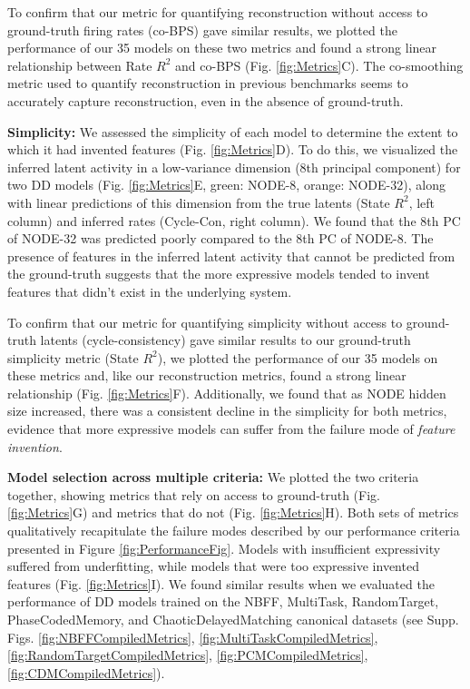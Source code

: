 \documentclass{article}
\begin{document}
To confirm that our metric for quantifying reconstruction without access to ground-truth firing rates (co-BPS) gave similar results, we plotted the performance of our 35 models on these two metrics and found a strong linear relationship between Rate $R^2$ and co-BPS (Fig. \ref{fig:Metrics}C). The co-smoothing metric used to quantify reconstruction in previous benchmarks \cite{pei_neural_2022} seems to accurately capture reconstruction, even in the absence of ground-truth.

\textbf{Simplicity:} We assessed the simplicity of each model to determine the extent to which it had invented features (Fig. \ref{fig:Metrics}D). To do this, we visualized the inferred latent activity in a low-variance dimension (8th principal component) for two DD models (Fig. \ref{fig:Metrics}E, green: NODE-8, orange: NODE-32), along with linear predictions of this dimension from the true latents (State $R^2$, left column) and inferred rates (Cycle-Con, right column). We found that the 8th PC of NODE-32 was predicted poorly compared to the 8th PC of NODE-8. The presence of features in the inferred latent activity that cannot be predicted from the ground-truth suggests that the more expressive models tended to invent features that didn’t exist in the underlying system.

To confirm that our metric for quantifying simplicity without access to ground-truth latents (cycle-consistency) gave similar results to our ground-truth simplicity metric (State $R^2$), we plotted the performance of our 35 models on these metrics and, like our reconstruction metrics, found a strong linear relationship (Fig. \ref{fig:Metrics}F). Additionally, we found that as NODE hidden size increased, there was a consistent decline in the simplicity for both metrics, evidence that more expressive models can suffer from the failure mode of \textit{feature invention}.

\textbf{Model selection across multiple criteria:} We plotted the two criteria together, showing metrics that rely on access to ground-truth (Fig. \ref{fig:Metrics}G) and metrics that do not (Fig. \ref{fig:Metrics}H). Both sets of metrics qualitatively recapitulate the failure modes described by our performance criteria presented in Figure \ref{fig:PerformanceFig}. Models with insufficient expressivity suffered from underfitting, while models that were too expressive invented features (Fig. \ref{fig:Metrics}I). We found similar results when we evaluated the performance of DD models trained on the NBFF, MultiTask, RandomTarget, PhaseCodedMemory, and ChaoticDelayedMatching canonical datasets (see Supp. Figs. \ref{fig:NBFFCompiledMetrics}, \ref{fig:MultiTaskCompiledMetrics}, \ref{fig:RandomTargetCompiledMetrics}, \ref{fig:PCMCompiledMetrics}, \ref{fig:CDMCompiledMetrics}).
\end{document}
